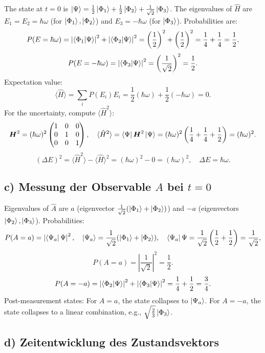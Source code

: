 \documentclass[a4paper,12pt]{article}
\begin{document}
The state at $t=0$ is $\ket{\Psi} = \frac{1}{2} \ket{\Phi_1} + \frac{1}{2} \ket{\Phi_2} + \frac{1}{\sqrt{2}} \ket{\Phi_3}$. The eigenvalues of $\hat{H}$ are $E_1 = E_2 = \hbar \omega$ (for $\ket{\Phi_1}, \ket{\Phi_2}$) and $E_3 = -\hbar \omega$ (for $\ket{\Phi_3}$). Probabilities are:
\[
P(E = \hbar \omega) = \left| \braket{\Phi_1}{\Psi} \right|^2 + \left| \braket{\Phi_2}{\Psi} \right|^2 = \left( \frac{1}{2} \right)^2 + \left( \frac{1}{2} \right)^2 = \frac{1}{4} + \frac{1}{4} = \frac{1}{2},
\]
\[
P(E = -\hbar \omega) = \left| \braket{\Phi_3}{\Psi} \right|^2 = \left( \frac{1}{\sqrt{2}} \right)^2 = \frac{1}{2}.
\]
Expectation value:
\[
\langle \hat{H} \rangle = \sum_i P(E_i) E_i = \frac{1}{2} (\hbar \omega) + \frac{1}{2} (-\hbar \omega) = 0.
\]
For the uncertainty, compute $\langle \hat{H}^2 \rangle$:
\[
\boldsymbol{H}^2 = (\hbar \omega)^2 \begin{pmatrix} 1 & 0 & 0 \\ 0 & 1 & 0 \\ 0 & 0 & 1 \end{pmatrix}, \quad \langle \hat{H}^2 \rangle = \bra{\Psi} \boldsymbol{H}^2 \ket{\Psi} = (\hbar \omega)^2 \left( \frac{1}{4} + \frac{1}{4} + \frac{1}{2} \right) = (\hbar \omega)^2.
\]
\[
(\Delta E)^2 = \langle \hat{H}^2 \rangle - \langle \hat{H} \rangle^2 = (\hbar \omega)^2 - 0 = (\hbar \omega)^2, \quad \Delta E = \hbar \omega.
\]

\subsection*{c) Messung der Observable $A$ bei $t=0$}

Eigenvalues of $\hat{A}$ are $a$ (eigenvector $\frac{1}{\sqrt{2}} (\ket{\Phi_1} + \ket{\Phi_2})$) and $-a$ (eigenvectors $\ket{\Phi_2}, \ket{\Phi_3}$). Probabilities:
\[
P(A = a) = \left| \bra{\Psi_a} \Psi \right|^2, \quad \ket{\Psi_a} = \frac{1}{\sqrt{2}} (\ket{\Phi_1} + \ket{\Phi_2}), \quad \bra{\Psi_a} \Psi = \frac{1}{\sqrt{2}} \left( \frac{1}{2} + \frac{1}{2} \right) = \frac{1}{\sqrt{2}},
\]
\[
P(A = a) = \left| \frac{1}{\sqrt{2}} \right|^2 = \frac{1}{2}.
\]
\[
P(A = -a) = \left| \braket{\Phi_2}{\Psi} \right|^2 + \left| \braket{\Phi_3}{\Psi} \right|^2 = \frac{1}{4} + \frac{1}{2} = \frac{3}{4}.
\]
Post-measurement states: For $A = a$, the state collapses to $\ket{\Psi_a}$. For $A = -a$, the state collapses to a linear combination, e.g., $\sqrt{\frac{2}{3}} \ket{\Phi_3}$.

\subsection*{d) Zeitentwicklung des Zustandsvektors}
\end{document}
